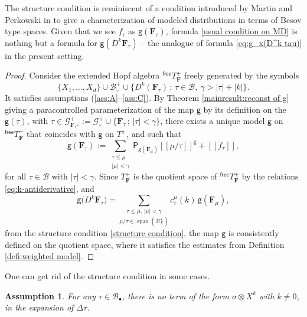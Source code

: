 \documentclass[JEP,XML,SOM,Unicode,published]{cedram}
\newcommand{\sbullet}{{\scriptscriptstyle\bullet}}
\DeclareMathOperator{\Span}{span}
\theoremstyle{plain}
\newtheorem{assumption}{Assumption}
\theoremstyle{definition}
\newcommand{\Brac}[1]{[\![#1]\!]}
\newcommand{\sfP}{\mathsf{P}}
\newcommand{\sfg}{\mathsf{g}}
\newcommand{\bsF}{\boldsymbol{F}}
\newcommand{\mcB}{\mathcal{B}}
\newcommand{\mcG}{\mathcal{G}}
\begin{document}
The structure condition is reminiscent of a condition introduced by Martin and Perkowski in \cite{MP18} to give a characterization of modeled distributions in terms of Besov type spaces. Given that we see $f_\tau$ as $\sfg({\bsF}_\tau)$, formula \eqref{usual condition on MD} is nothing but a formula for ${\sfg}(D^k{\bsF}_\tau)$ -- the analogue of formula \eqref{eq:g_x(D^k tau)} in the present setting.

\begin{proof}
Consider the extended Hopf algebra $^\textsf{free}T_{\bsF}^+$ freely generated by the symbols
\[
\{X_1,\dots,X_d\}\cup\mcB_\circ^+\cup\big\{D^k(\bsF_\tau)\,;\, \tau\in\mcB,\ \gamma>|\tau|+|k|\big\}.
\]
It satisfies assumptions (\ref{ass:A}--\ref{ass:C}).
By Theorem \ref{mainresult:reconst of g} giving a paracontrolled parameterization of the map $\sfg$ by its definition on the $\sfg(\tau)$, with $\tau\in\mcG^+_{\bsF,\circ} := \mcG^+_\circ\cup\big\{{\bsF}_\tau\,;\,\vert\tau\vert<\gamma\big\}$, there exists a unique model $\sfg$ on $^\textsf{free}T_{\bsF}^+$ that coincides with $\sfg$ on $T^+$, and such that
\[
\sfg(\bsF_\tau) := \sum_{\substack{\tau\le\mu\\|\mu|<\gamma}}\sfP_{\sfg(\bsF_\mu)}\Brac{\mu/\tau}^{\sfg} + \Brac{f_\tau},
\]
for all $\tau\in\mcB$ with $\vert\tau\vert<\gamma$. Since $T_{\bsF}^+$ is the quotient space of $^\textsf{free}T_{\bsF}^+$ by the relations \eqref{eq:k-antiderivative}, and
\[
\sfg\bigl(D^k\bsF_\tau\bigr) = \underset{\mu/\tau\in\Span (\mcB_X^+)}{\sum_{\tau\leq\mu, \,|\mu|<\gamma}} c_\tau^\mu(k)\,\sfg(\bsF_\mu),
\]
from the structure condition \eqref{structure condition}, the map $\sfg$ is consistently defined on the quotient space, where it satisfies the estimates from Definition \ref{defi:weighted model}.
\end{proof}

One can get rid of the structure condition in some cases.

\begin{assumption}\label{ass:D}
For any $\tau\in\mcB_\sbullet$, there is no term of the form $\sigma\otimes X^k$ with $k\neq0$, in the expansion of $\Delta\tau$.
\end{assumption}
\end{document}
